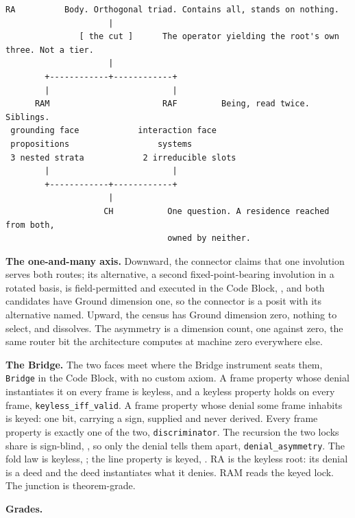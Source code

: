 \documentclass[10pt,twocolumn]{article}
\begin{document}
\begin{lstlisting}[style=plainv]
                    RA          Body. Orthogonal triad. Contains all, stands on nothing.
                     |
               [ the cut ]      The operator yielding the root's own three. Not a tier.
                     |
        +------------+------------+
        |                         |
      RAM                       RAF         Being, read twice. Siblings.
 grounding face            interaction face
 propositions                  systems
 3 nested strata            2 irreducible slots
        |                         |
        +------------+------------+
                     |
                    CH           One question. A residence reached from both,
                                 owned by neither.
\end{lstlisting}

\textbf{The one-and-many axis.} Downward, the connector claims that one
involution serves both routes; its alternative, a second
fixed-point-bearing involution in a rotated basis, is field-permitted
and executed in the Code Block,
\texttt{}, and both
candidates have Ground dimension one, so the connector is a posit with
its alternative named. Upward, the census has Ground dimension zero,
nothing to select, and dissolves. The asymmetry is a dimension count,
one against zero, the same router bit the architecture computes at
machine zero everywhere else.

\textbf{The Bridge.} The two faces meet where the Bridge instrument
seats them, \texttt{Bridge} in the Code Block, with no custom axiom. A
frame property whose denial instantiates it on every frame is keyless,
and a keyless property holds on every frame,
\texttt{keyless\_iff\_valid}. A frame property whose denial some frame
inhabits is keyed: one bit, carrying a sign, supplied and never derived.
Every frame property is exactly one of the two, \texttt{discriminator}.
The recursion the two locks share is sign-blind,
\texttt{}, so only the denial tells
them apart, \texttt{denial\_asymmetry}. The fold law is keyless,
\texttt{}; the line property is keyed,
\texttt{}. RA is the keyless root:
its denial is a deed and the deed instantiates what it denies. RAM reads
the keyed lock. The junction is theorem-grade.

\textbf{Grades.}
\end{document}
